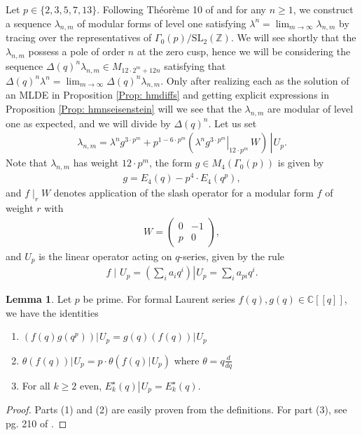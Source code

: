 \documentclass[10pt,a4paper]{amsart}
\numberwithin{equation}{section}
\theoremstyle{definition}
\newtheorem{Lemma}[Th]{Lemma}
\newcommand{\haupt}{\lambda}
\newcommand{\upee}[1]{\left. #1 \right\rvert \hspace{1pt} U_{p}}
\begin{document}
Let $p \in \lbrace 2,3,5,7,13 \rbrace$. Following Th\'eor\`eme 10 of \cite{pSerre} and for any $n \geq 1$, we construct a sequence $\haupt_{n,m}$ of modular forms of level one satisfying $\haupt^{n} = \lim_{m \to \infty} \haupt_{n,m}$ by tracing over the representatives of $\Gamma_{0}(p) / \text{SL}_{2}(\mathbb{Z})$. We will see shortly that the $\haupt_{n,m}$ possess a pole of order $n$ at the zero cusp, hence we will be considering the sequence $\Delta (q)^{n} \haupt_{n,m} \in M_{12 \cdot 2^{m}+12n}$ satisfying that $\Delta (q)^{n} \haupt^{n} = \lim_{m \to \infty} \Delta (q)^{n} \haupt_{n,m}$. Only after realizing each as the solution of an MLDE in Proposition \ref{Prop: hmdiffs} and getting explicit expressions in Proposition \ref{Prop: hmnseisenstein} will we see that the $\haupt_{n,m}$ are modular of level one as expected, and we will divide by $\Delta (q)^{n}$. Let us set
\begin{align}
    \haupt_{n,m} = \haupt^{n} g^{3 \cdot p^{m}} + p^{1 - 6 \cdot p^{m}} \upee{ \left( \left. \haupt^{n}g^{3 \cdot p^{m}} \right\rvert_{12 \cdot p^{m}} \hspace{2pt} W \right) \hspace{2pt} }. \label{hmraweq}
\end{align}
Note that $\haupt_{n,m}$ has weight $12 \cdot p^{m}$, the form $g \in M_{4}(\Gamma_{0}(p))$ is given by
\begin{align*}
    g = E_{4}(q) - p^{4} \cdot E_{4}(q^{p}),
\end{align*}
and $f \mid_{r} W$ denotes application of the slash operator for a modular form $f$ of weight $r$ with
\begin{align*}
    W = \begin{pmatrix} 0 & -1 \\ p & 0 \end{pmatrix},
\end{align*}
and $U_{p}$ is the linear operator acting on $q$-series, given by the rule
\begin{align*}
    f \mid \hspace{1pt} U_{p} = \upee{ \left( \sum_{i} a_{i} q^{i} \right) } = \sum_{i} a_{pi} q^{i}.
\end{align*}

\begin{Lemma} \label{Lemma: Upoperator}
    Let $p$ be prime. For formal Laurent series $f(q), g(q) \in \mathbb{C}[[q]]$, we have the identities
    \begin{enumerate}
        \item $\upee{ \left( f(q) g(q^{p}) \right) } =  g (q) \upee{ \left( f (q) \right) }$
        \item $\upee{ \theta (f(q)) } = p \cdot \theta \left( \upee{ f(q) }  \right)$ where $\theta = q \frac{d}{dq}$
        \item For all $k \geq 2$ even, $\upee{ E_{k}^{\star}(q) }= E_{k}^{\star}(q)$.
    \end{enumerate}
\end{Lemma}
\begin{proof}
    Parts (1) and (2) are easily proven from the definitions. For part (3), see pg. 210 of \cite{pSerre}.
\end{proof}
\end{document}
